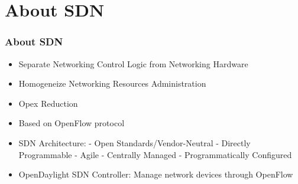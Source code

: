 \section{About SDN}

\begin{frame}[allowframebreaks]
\frametitle{About SDN}

\begin{itemize}
 \item Separate Networking Control Logic from Networking Hardware
	\item Homogeneize Networking Resources Administration
 \item Opex Reduction
	\item Based on OpenFlow protocol
 \item SDN Architecture:\linebreak
	- Open Standards/Vendor-Neutral\linebreak
	- Directly Programmable\linebreak
	- Agile\linebreak
	- Centrally Managed\linebreak
	- Programmatically Configured
 \item OpenDaylight SDN Controller: Manage network devices through OpenFlow\linebreak
\end{itemize}

\end{frame}
